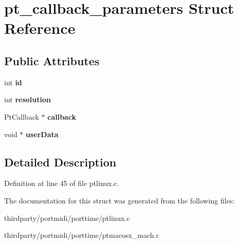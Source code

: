 \hypertarget{structpt__callback__parameters}{}\section{pt\+\_\+callback\+\_\+parameters Struct Reference}
\label{structpt__callback__parameters}
\subsection*{Public Attributes}
\begin{DoxyCompactItemize}
\item 
\mbox{\label{structpt__callback__parameters_aacadd50758ca9ababae9a1db0b6cbc63}} 
int {\bfseries id}
\item 
\mbox{\label{structpt__callback__parameters_a6fbc94070203cea7f70c85f2fe1b205c}} 
int {\bfseries resolution}
\item 
\mbox{\label{structpt__callback__parameters_a678d163dd60f8597c9e79abab9bacfb0}} 
Pt\+Callback $\ast$ {\bfseries callback}
\item 
\mbox{\label{structpt__callback__parameters_ade1aadaf39085d58efdbca011bdd8ed3}} 
void $\ast$ {\bfseries user\+Data}
\end{DoxyCompactItemize}


\subsection{Detailed Description}


Definition at line 45 of file ptlinux.\+c.



The documentation for this struct was generated from the following files\+:\begin{DoxyCompactItemize}
\item 
thirdparty/portmidi/porttime/ptlinux.\+c\item 
thirdparty/portmidi/porttime/ptmacosx\+\_\+mach.\+c\end{DoxyCompactItemize}
